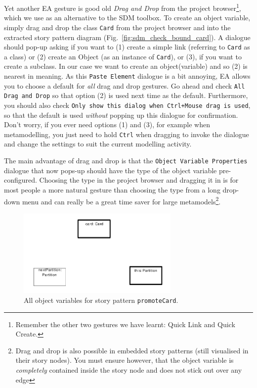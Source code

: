 Yet another EA gesture is good old \emph{Drag and Drop} from the project
browser\footnote{Remember the other two gestures we have learnt:  Quick Link
and Quick Create.}, which we use as an alternative to the SDM toolbox.  
To create an object variable, simply drag and drop the class
\texttt{Card} from the project browser and into the extracted story
pattern diagram (Fig.~\ref{fig:sdm_check_bound_card}).  A dialogue should pop-up
asking if you want to (1) create a simple link (referring to \texttt{Card} as a
class) or (2) create an Object (as an instance of \texttt{Card}), or (3), if you
want to create a subclass.  In our case we want to create an object(variable) 
and so (2) is nearest in meaning.  As this \texttt{Paste Element} dialogue is a
bit annoying, EA  allows you to choose a default for \emph{all} drag and drop
gestures.  Go ahead and check \texttt{All Drag and Drop} so that option (2) is
used next time as the default.  Furthermore, you should also check 
\texttt{Only show this dialog when Ctrl+Mouse drag is used}, so that the 
default is used \emph{without} popping up this dialogue for confirmation. Don't worry,
if you ever need options (1) and (3), for example when metamodelling, you  just
need to hold \texttt{Ctrl} when dragging to invoke the dialogue and change  the
settings to suit the current modelling activity. 

The main advantage of drag and drop is that the \texttt{Object Variable
Pro\-per\-ties} dialogue that now pops-up should have the type of the object
variable pre-configured. Choosing the type in the project browser and dragging it in
is for most people a more natural gesture than choosing the type from a long
drop-down menu and can really be a great time saver for large
metamodels\footnote{Drag and drop is also possible in embedded story patterns
(still visualised in their story nodes).  You must ensure however, that the
object variable is \emph{completely} contained inside the story node and does
not stick out over any edge}. 

\begin{figure}[htbp]
\begin{center}
  \includegraphics[width=0.7\textwidth]{pics/sdmBilder/check/sdm25}
  \caption{All object variables for story pattern \texttt{promoteCard}.}  
  \label{fig:sdm_check_complete_sp}
\end{center}
\end{figure}

